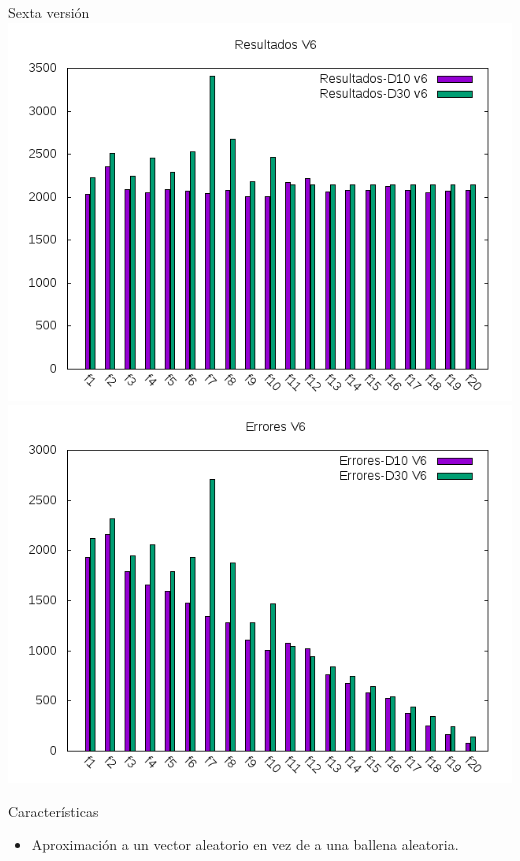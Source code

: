 \documentclass[10pt]{beamer}
\begin{document}
	\begin{frame}[fragile]{Sexta versión}
		\centering
		\includegraphics[scale=0.25]{./Imagenes/Resultados/resultados_v6.png}
		\includegraphics[scale=0.25]{./Imagenes/Errores/errores_v6.png}
		
		\begin{block}{Características}
			\begin{itemize}
				\item Aproximación a un vector aleatorio en vez de a una ballena aleatoria.
			\end{itemize}
		\end{block}
	\end{frame}
\end{document}

